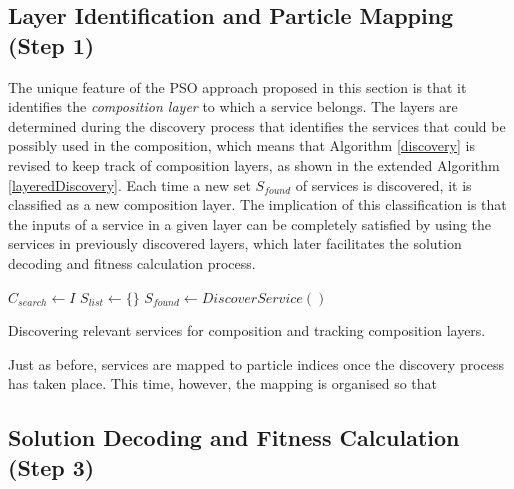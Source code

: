 \documentclass{llncs}
\begin{document}
\subsection{Layer Identification and Particle Mapping (Step 1)}

The unique feature of the PSO approach proposed in this section is that it identifies the \textit{composition layer} to which a service belongs. The layers are determined during the discovery process that identifies the services that could be possibly used in the composition, which means that Algorithm \ref{discovery} is revised to keep track of composition layers, as shown in the extended Algorithm \ref{layeredDiscovery}. Each time a new set $S_{found}$ of services is discovered, it is classified as a new composition layer. The implication of this classification is that the inputs of a service in a given layer can be completely satisfied by using the services in previously discovered layers, which later facilitates the solution decoding and fitness calculation process.

\begin{algorithm}
\setlength{}
 \LinesNumbered
 \SetNlSty{}{}{:}
 $C_{search} \leftarrow I$\;
 $S_{list} \leftarrow \{\}$\;
 $S_{found} \leftarrow DiscoverService()$\;
\caption{Discovering relevant services for composition and tracking composition layers.}
\label{layeredDiscovery}
\end{algorithm}

Just as before, services are mapped to particle indices once the discovery process has taken place. This time, however, the mapping is organised so that 

\subsection{Solution Decoding and Fitness Calculation (Step 3)}
\end{document}
